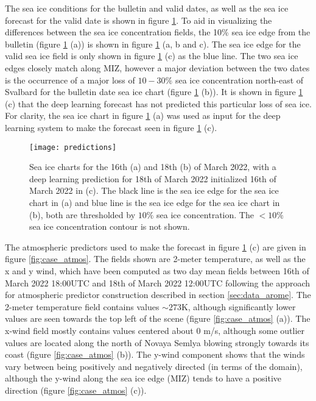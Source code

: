 \documentclass[../main/thesis.tex]{subfiles}
\begin{document}
The sea ice conditions for the bulletin and valid dates, as well as the sea ice forecast for the valid date is shown in figure \ref{fig:case_preds}. To aid in visualizing the differences between the sea ice concentration fields, the 10\% sea ice edge from the bulletin (figure \ref{fig:case_preds} (a)) is shown in figure \ref{fig:case_preds} (a, b and c). The sea ice edge for the valid sea ice field is only shown in figure \ref{fig:case_preds} (c) as the blue line. The two sea ice edges closely match along MIZ, however a major deviation between the two dates is the occurrence of a major loss of $10-30\%$ sea ice concentration north-east of Svalbard for the bulletin date sea ice chart (figure \ref{fig:case_preds} (b)). It is shown in figure \ref{fig:case_preds} (c) that the deep learning forecast has not predicted this particular loss of sea ice. For clarity, the sea ice chart in figure \ref{fig:case_preds} (a) was used as input for the deep learning system to make the forecast seen in figure \ref{fig:case_preds} (c).

\begin{figure}
    \centering
    \texttt{[image: predictions]}
    \caption{\label{fig:case_preds}Sea ice charts for the 16th (a) and 18th (b) of March 2022, with a deep learning prediction for 18th of March 2022 initialized 16th of March 2022 in (c). The black line is the sea ice edge for the sea ice chart in (a) and blue line is the sea ice edge for the sea ice chart in (b), both are thresholded by $10\%$ sea ice concentration. The $<10\%$ sea ice concentration contour is not shown.}
\end{figure}

The atmospheric predictors used to make the forecast in figure \ref{fig:case_preds} (c) are given in figure \ref{fig:case_atmos}. The fields shown are 2-meter temperature, as well as the x and y wind, which have been computed as two day mean fields between 16th of March 2022 18:00UTC and 18th of March 2022 12:00UTC following the approach for atmospheric predictor construction described in section \ref{sec:data_arome}. The 2-meter temperature field contains values $\sim 273$K, although significantly lower values are seen towards the top left of the scene (figure \ref{fig:case_atmos} (a)). The x-wind field mostly contains values centered about 0 m/s, although some outlier values are located along the north of Novaya Semlya blowing strongly towards its coast (figure \ref{fig:case_atmos} (b)). The y-wind component shows that the winds vary between being positively and negatively directed (in terms of the domain), although the y-wind along the sea ice edge (MIZ) tends to have a positive direction (figure \ref{fig:case_atmos} (c)).
\end{document}

